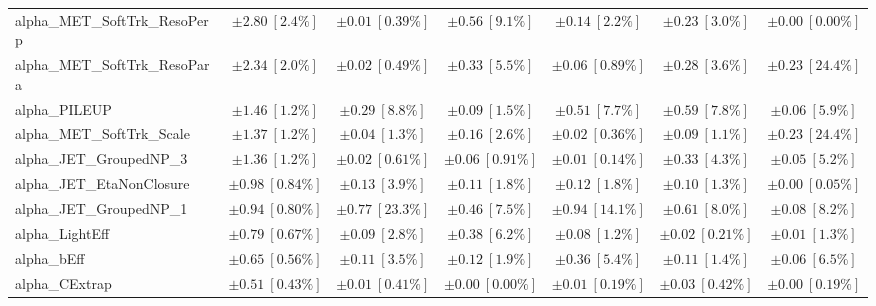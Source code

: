 \begin{sidewaystable}
\begin{center}
\begin{tabular*}{\textwidth}{@{\extracolsep{\fill}}lcccccc}
alpha\_MET\_SoftTrk\_ResoPerp         & $\pm 2.80\ [2.4\%] $          & $\pm 0.01\ [0.39\%] $          & $\pm 0.56\ [9.1\%] $          & $\pm 0.14\ [2.2\%] $          & $\pm 0.23\ [3.0\%] $          & $\pm 0.00\ [0.00\%] $       \\
alpha\_MET\_SoftTrk\_ResoPara         & $\pm 2.34\ [2.0\%] $          & $\pm 0.02\ [0.49\%] $          & $\pm 0.33\ [5.5\%] $          & $\pm 0.06\ [0.89\%] $          & $\pm 0.28\ [3.6\%] $          & $\pm 0.23\ [24.4\%] $       \\
alpha\_PILEUP         & $\pm 1.46\ [1.2\%] $          & $\pm 0.29\ [8.8\%] $          & $\pm 0.09\ [1.5\%] $          & $\pm 0.51\ [7.7\%] $          & $\pm 0.59\ [7.8\%] $          & $\pm 0.06\ [5.9\%] $       \\
alpha\_MET\_SoftTrk\_Scale         & $\pm 1.37\ [1.2\%] $          & $\pm 0.04\ [1.3\%] $          & $\pm 0.16\ [2.6\%] $          & $\pm 0.02\ [0.36\%] $          & $\pm 0.09\ [1.1\%] $          & $\pm 0.23\ [24.4\%] $       \\
alpha\_JET\_GroupedNP\_3         & $\pm 1.36\ [1.2\%] $          & $\pm 0.02\ [0.61\%] $          & $\pm 0.06\ [0.91\%] $          & $\pm 0.01\ [0.14\%] $          & $\pm 0.33\ [4.3\%] $          & $\pm 0.05\ [5.2\%] $       \\
alpha\_JET\_EtaNonClosure         & $\pm 0.98\ [0.84\%] $          & $\pm 0.13\ [3.9\%] $          & $\pm 0.11\ [1.8\%] $          & $\pm 0.12\ [1.8\%] $          & $\pm 0.10\ [1.3\%] $          & $\pm 0.00\ [0.05\%] $       \\
alpha\_JET\_GroupedNP\_1         & $\pm 0.94\ [0.80\%] $          & $\pm 0.77\ [23.3\%] $          & $\pm 0.46\ [7.5\%] $          & $\pm 0.94\ [14.1\%] $          & $\pm 0.61\ [8.0\%] $          & $\pm 0.08\ [8.2\%] $       \\
alpha\_LightEff         & $\pm 0.79\ [0.67\%] $          & $\pm 0.09\ [2.8\%] $          & $\pm 0.38\ [6.2\%] $          & $\pm 0.08\ [1.2\%] $          & $\pm 0.02\ [0.21\%] $          & $\pm 0.01\ [1.3\%] $       \\
alpha\_bEff         & $\pm 0.65\ [0.56\%] $          & $\pm 0.11\ [3.5\%] $          & $\pm 0.12\ [1.9\%] $          & $\pm 0.36\ [5.4\%] $          & $\pm 0.11\ [1.4\%] $          & $\pm 0.06\ [6.5\%] $       \\
alpha\_CExtrap         & $\pm 0.51\ [0.43\%] $          & $\pm 0.01\ [0.41\%] $          & $\pm 0.00\ [0.00\%] $          & $\pm 0.01\ [0.19\%] $          & $\pm 0.03\ [0.42\%] $          & $\pm 0.00\ [0.19\%] $       \\

\end{tabular*}
\end{center}
\end{sidewaystable}
